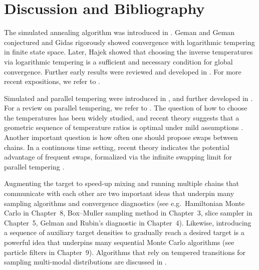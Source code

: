 
\section{Discussion and Bibliography}
\label{sec:7.3}

The simulated annealing algorithm was introduced in \cite{124}. Geman and Geman \cite{82}
conjectured and Gidas \cite{87} rigorously showed convergence with logarithmic tempering in
finite state space. Later, Hajek \cite{103} showed that choosing the inverse temperatures via
logarithmic tempering is a sufficient and necessary condition for global convergence. Further
early results were reviewed and developed in \cite{228, 221, 1, 2}. For more recent
expositions, we refer to \cite{109, 149}.

Simulated and parallel tempering were introduced in \cite{220, 154}, and further developed in
\cite{85, 114}. For a review on parallel tempering, we refer to \cite{66}. The question of how
to choose the temperatures has been widely studied, and recent theory suggests that a geometric
sequence of temperature ratios is optimal under mild assumptions \cite{63}. Another important
question is how often one should propose swaps between chains. In a continuous time setting,
recent theory indicates the potential advantage of frequent swaps, formalized via the infinite
swapping limit for parallel tempering \cite{62}.

Augmenting the target to speed-up mixing and running multiple chains that communicate with each
other are two important ideas that underpin many sampling algorithms and convergence diagnostics
(see e.g.\ Hamiltonian Monte Carlo in Chapter~8, Box--Muller sampling method in Chapter~3,
slice sampler in Chapter~5, Gelman and Rubin's diagnostic in Chapter~4). Likewise, introducing
a sequence of auxiliary target densities to gradually reach a desired target is a powerful idea
that underpins many sequential Monte Carlo algorithms (see particle filters in Chapter~9).
Algorithms that rely on tempered transitions for sampling multi-modal distributions are
discussed in \cite{168}.
